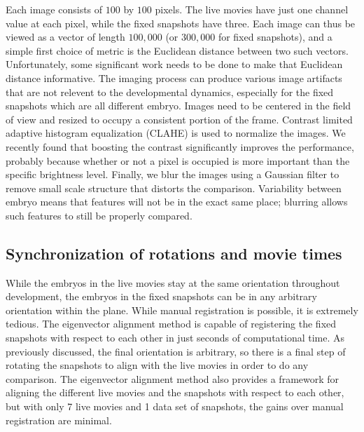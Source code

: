 \documentclass[12pt]{article}
\begin{document}
Each image consists of $100$ by $100$ pixels.  The live movies have just one channel value at each pixel, while the fixed snapshots have three. Each image can thus be viewed as a vector of length $100,000$ (or $300,000$ for fixed snapshots), and a simple first choice of metric is the Euclidean distance between two such vectors. Unfortunately, some significant work needs to be done to make that Euclidean distance informative. The imaging process can produce various image artifacts that are not relevent to the developmental dynamics, especially for the fixed snapshots which are all different embryo. Images need to be centered in the field of view and resized to occupy a consistent portion of the frame. Contrast limited adaptive histogram equalization (CLAHE) is used to normalize the images. We recently found that boosting the contrast significantly improves the performance, probably because whether or not a pixel is occupied is more important than the specific brightness level. Finally, we blur the images using a Gaussian filter to remove small scale structure that distorts the comparison. Variability between embryo means that features will not be in the exact same place; blurring allows such features to still be properly compared.

\subsection{Synchronization of rotations and movie times}

While the embryos in the live movies stay at the same orientation throughout development, the embryos in the fixed snapshots can be in any arbitrary orientation within the plane. While manual registration is possible, it is extremely tedious. The eigenvector alignment method is capable of registering the fixed snapshots with respect to each other in just seconds of computational time. As previously discussed, the final orientation is arbitrary, so there is a final step of rotating the snapshots to align with the live movies in order to do any comparison. The eigenvector alignment method also provides a framework for aligning the different live movies and the snapshots with respect to each other, but with only 7 live movies and 1 data set of snapshots, the gains over manual registration are minimal. \vspace{1mm}
\end{document}

